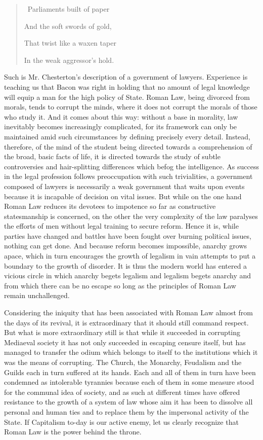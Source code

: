 \documentclass{book}
\begin{document}
\begin{quotation}\
	Parliaments built of paper

	And the soft swords of gold,

	That twist like a waxen taper

	In the weak aggressor’s hold.
\end{quotation}

Such is Mr. Chesterton’s description of a government of lawyers. Experience is teaching us that Bacon was right in holding that no amount of legal knowledge will equip a man for the high policy of State. Roman Law, being divorced from morals, tends to corrupt the minds, where it does not corrupt the morals of those who study it. And it comes about this way: without a base in morality, law inevitably becomes increasingly complicated, for its framework can only be maintained amid such circumstances by defining precisely every detail. Instead, therefore, of the mind of the student being directed towards a comprehension of the broad, basic facts of life, it is directed towards the study of subtle controversies and hair-splitting differences which befog the intelligence. As success in the legal profession follows preoccupation with such trivialities, a government composed of lawyers is necessarily a weak government that waits upon events because it is incapable of decision on vital issues. But while on the one hand Roman Law reduces its devotees to impotence so far as constructive statesmanship is concerned, on the other the very complexity of the law paralyses the efforts of men without legal training to secure reform. Hence it is, while parties have changed and battles have been fought over burning political issues, nothing can get done. And because reform becomes impossible, anarchy grows apace, which in turn encourages the growth of legalism in vain attempts to put a boundary to the growth of disorder. It is thus the modern world has entered a vicious circle in which anarchy begets legalism and legalism begets anarchy and from which there can be no escape so long as the principles of Roman Law remain unchallenged.

Considering the iniquity that has been associated with Roman Law almost from the days of its revival, it is extraordinary that it should still command respect. But what is more extraordinary still is that while it succeeded in corrupting Mediaeval society it has not only succeeded in escaping censure itself, but has managed to transfer the odium which belongs to itself to the institutions which it was the means of corrupting. The Church, the Monarchy, Feudalism and the Guilds each in turn suffered at its hands. Each and all of them in turn have been condemned as intolerable tyrannies because each of them in some measure stood for the communal idea of society, and as such at different times have offered resistance to the growth of a system of law whose aim it has been to dissolve all personal and human ties and to replace them by the impersonal activity of the State. If Capitalism to-day is our active enemy, let us clearly recognize that Roman Law is the power behind the throne.
\end{document}
